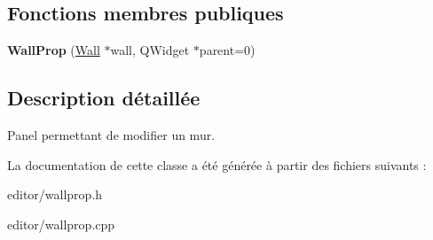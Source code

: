 \subsection*{Fonctions membres publiques}
\begin{DoxyCompactItemize}
\item 
\hypertarget{classWallProp_adb6bbb2ab2fbbb9a8e15a3f38b421595}{{\bfseries Wall\+Prop} (\hyperlink{classWall}{Wall} $\ast$wall, Q\+Widget $\ast$parent=0)}\label{classWallProp_adb6bbb2ab2fbbb9a8e15a3f38b421595}

\end{DoxyCompactItemize}


\subsection{Description détaillée}
Panel permettant de modifier un mur. 

La documentation de cette classe a été générée à partir des fichiers suivants \+:\begin{DoxyCompactItemize}
\item 
editor/wallprop.\+h\item 
editor/wallprop.\+cpp\end{DoxyCompactItemize}
